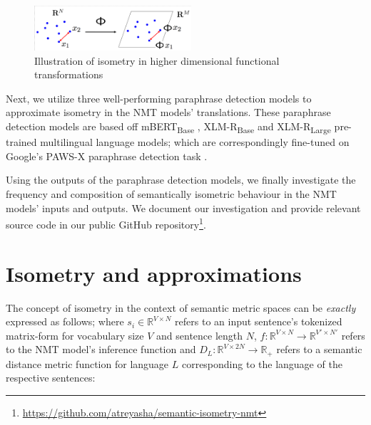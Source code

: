 \documentclass[11pt,a4paper]{article}
\begin{document}
\begin{figure}
  \centering
  \includegraphics[trim={1.0cm 0cm 0cm 1.0cm},clip,width=0.52\textwidth]{isometry_visualized.png}
  \caption{Illustration of isometry in higher dimensional functional transformations \citep{Hegde-Numax}}
  \label{isometry_visual}
\end{figure}

Next, we utilize three well-performing paraphrase detection models to approximate isometry in the NMT models' translations. These paraphrase detection models are based off mBERT\textsubscript{Base} \cite{devlin-etal-2019-bert}, XLM-R\textsubscript{Base} and XLM-R\textsubscript{Large} \cite{conneau2019unsupervised} pre-trained multilingual language models; which are correspondingly fine-tuned on Google's PAWS-X paraphrase detection task \cite{pawsx2019emnlp, hu2020xtreme}.
 
Using the outputs of the paraphrase detection models, we finally investigate the frequency and composition of semantically isometric behaviour in the NMT models' inputs and outputs. We document our investigation and provide relevant source code in our public GitHub repository\footnote{\url{https://github.com/atreyasha/semantic-isometry-nmt}}.


\section{Isometry and approximations}

The concept of isometry in the context of semantic metric spaces can be \textit{exactly} expressed as follows; where $s_i \in \mathbb{R}^{V \times N}$ refers to an input sentence's tokenized matrix-form for vocabulary size $V$ and sentence length $N$, $f: \mathbb{R}^{V \times N} \to \mathbb{R}^{V' \times N'}$ refers to the NMT model's inference function and $D_L: \mathbb{R}^{V \times 2N} \to \mathbb{R}_+$ refers to a semantic distance metric function for language $L$ corresponding to the language of the respective sentences:
\end{document}
